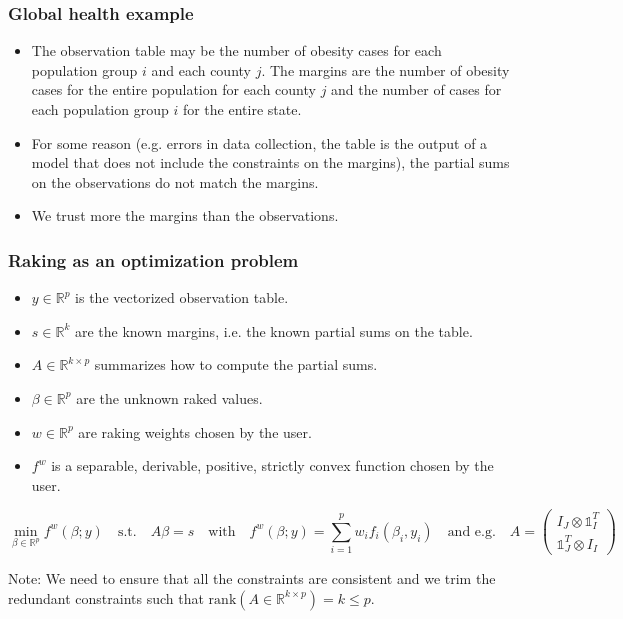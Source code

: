 \documentclass[aspectratio=169]{beamer}
\begin{document}
\begin{frame}
	\frametitle{Global health example}
	\begin{itemize}
		\setlength\itemsep{2em}
		\item The observation table may be the number of obesity cases for each population group $i$ and each county $j$. The margins are the number of obesity cases for the entire population for each county $j$ and the number of cases for each population group $i$ for the entire state.
		\item For some reason (e.g. errors in data collection, the table is the output of a model that does not include the constraints on the margins), the partial sums on the observations do not match the margins.
		\item We trust more the margins than the observations.
	\end{itemize}
\end{frame}

\begin{frame}
	\frametitle{Raking as an optimization problem}
	\begin{itemize}
		\item[] $y \in \mathbb{R}^p$ is the vectorized observation table.
		\item[] $s \in \mathbb{R}^k$ are the known margins, i.e. the known partial sums on the table.
		\item[] $A \in \mathbb{R}^{k \times p}$ summarizes how to compute the partial sums.
		\item[] $\beta \in \mathbb{R}^p$ are the unknown raked values.
		\item[] $w \in \mathbb{R}^p$ are raking weights chosen by the user.
		\item[] $f^w$ is a separable, derivable, positive, strictly convex function chosen by the user.
	\end{itemize}

	\begin{equation*}
	\min_{\beta \in \mathbb{R}^p} f^w \left( \beta ; y \right) \quad \text{s.t.} \quad A \beta = s \quad \text{with} \quad f^w \left( \beta ; y \right) = \sum_{i = 1}^p w_i f_i \left( \beta_i , y_i \right) \quad \text{and e.g.} \quad A = \begin{pmatrix} I_J \otimes \mathbb{1}_I^T \\ \mathbb{1}_J^T \otimes I_I \end{pmatrix}
	\end{equation*}

	\vspace{2em}

	Note: We need to ensure that all the constraints are consistent and we trim the redundant constraints such that $\text{rank} \left( A \in \mathbb{R}^{k \times p} \right) = k \leq p $.
\end{frame}
\end{document}
